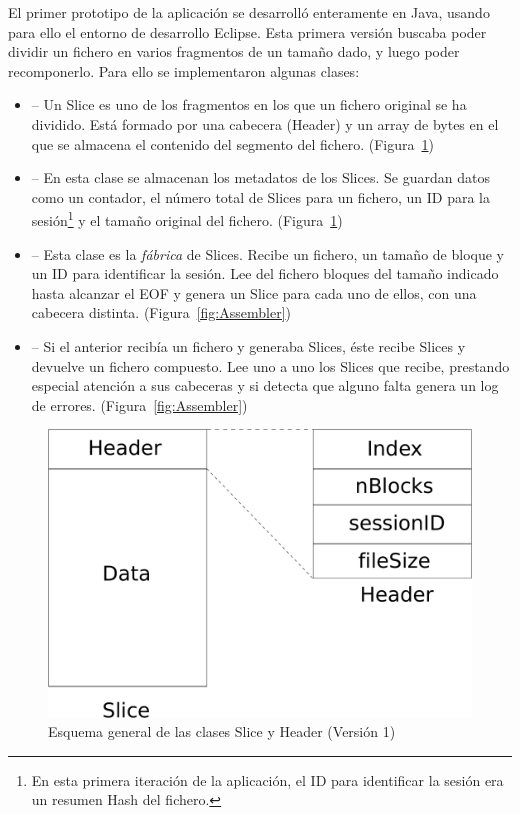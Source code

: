 El primer prototipo de la aplicación se desarrolló enteramente en Java, usando para ello el entorno
de desarrollo Eclipse. Esta primera versión buscaba poder dividir un fichero en varios fragmentos
de un tamaño dado, y luego poder recomponerlo. Para ello se implementaron algunas clases:

\begin{itemize}
  \item {} -- Un Slice es uno de los fragmentos en los que un
  fichero original se ha dividido. Está formado por una cabecera (Header) y un
  array de bytes en el que se almacena el contenido del segmento del fichero.
  (Figura~\ref{fig:Slice_Header_1})

  \item {} -- En esta clase se almacenan los metadatos de los
  Slices. Se guardan datos como un contador, el número total de Slices
  para un fichero, un ID para la sesión\footnote{En esta primera iteración de la
  aplicación, el ID para identificar la sesión era un resumen Hash del fichero.}
  y el tamaño original del fichero. (Figura~\ref{fig:Slice_Header_1})

  \item {} -- Esta clase es la \emph{fábrica} de Slices. Recibe
  un fichero, un tamaño de bloque y un ID para identificar la sesión. Lee del
  fichero bloques del tamaño indicado hasta alcanzar el EOF y genera un Slice
  para cada uno de ellos, con una cabecera distinta. (Figura~\ref{fig:Assembler})

  \item {} -- Si el anterior recibía un fichero y generaba Slices,
  éste recibe Slices y devuelve un fichero compuesto. Lee uno a uno los Slices
  que recibe, prestando especial atención a sus cabeceras y si detecta que
  alguno falta genera un log de errores. (Figura~\ref{fig:Assembler})
\end{itemize}

\begin{figure}[ht]
  \centering
  \includegraphics[scale=0.4]{Figures/Slice_Header_1}
  \decoRule
  \caption[Slice - Header (Versión 1)]{Esquema general de las clases Slice y Header (Versión 1)}
  \label{fig:Slice_Header_1}
\end{figure}


